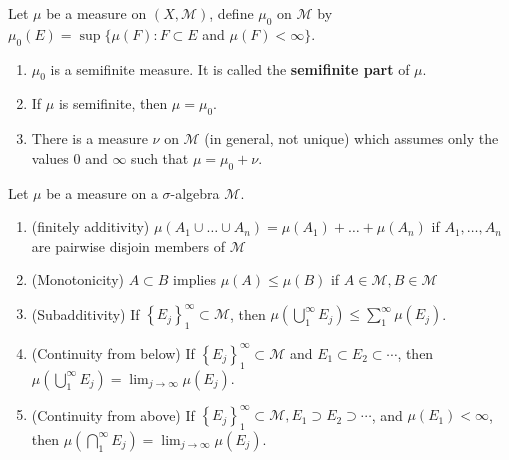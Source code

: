 \documentclass[12pt, a4paper, oneside]{book}
\begin{document}
\begin{theorem}
    Let $\mu$ be a measure on $(X, \mathcal{M})$, define $\mu_0$ on $\mathcal{M}$ by $\mu_0(E)=\sup \{\mu(F): F \subset E$ and $\mu(F)<\infty\}$.
    \begin{enumerate}
        \item
              $\mu_0$ is a semifinite measure. It is called the \textbf{semifinite part} of $\mu$.
        \item
              If $\mu$ is semifinite, then $\mu=\mu_0$.

        \item
              There is a measure $\nu$ on $\mathcal{M}$ (in general, not unique) which assumes only the values 0 and $\infty$ such that $\mu=\mu_0+\nu$.
    \end{enumerate}
\end{theorem}

\begin{proposition}
    Let $\mu$ be a measure on a $\sigma$-algebra $\mathcal{M}$.
    \begin{enumerate}
        \item
              (finitely additivity)
              $\mu ( A_{1}\cup \ldots \cup A_{n}) = \mu ( A_{1}) + \ldots+ \mu ( A_{n})$ if $A_1,\ldots,A_{n}$ are pairwise disjoin members of $\mathcal{M}$


        \item
              (Monotonicity)
              $A\subset B$ implies $\mu(A)\leq\mu(B)$ if $A\in\mathcal{M},B\in\mathcal{M}$

        \item (Subadditivity) If $\left\{E_j\right\}_1^{\infty} \subset \mathcal{M}$, then $\mu\left(\bigcup_1^{\infty} E_j\right) \leq \sum_1^{\infty} \mu\left(E_j\right)$.

        \item (Continuity from below) If $\left\{E_j\right\}_1^{\infty} \subset \mathcal{M}$ and $E_1 \subset E_2 \subset \cdots$, then $\mu\left(\bigcup_1^{\infty} E_j\right)=\lim _{j \rightarrow \infty} \mu\left(E_j\right)$.

        \item(Continuity from above) If $\left\{E_j\right\}_1^{\infty} \subset \mathcal{M}, E_1 \supset E_2 \supset \cdots$, and $\mu\left(E_1\right)<\infty$, then $\mu\left(\bigcap_1^{\infty} E_j\right)=\lim _{j \rightarrow \infty} \mu\left(E_j\right)$.
    \end{enumerate}
\end{proposition}
\end{document}
